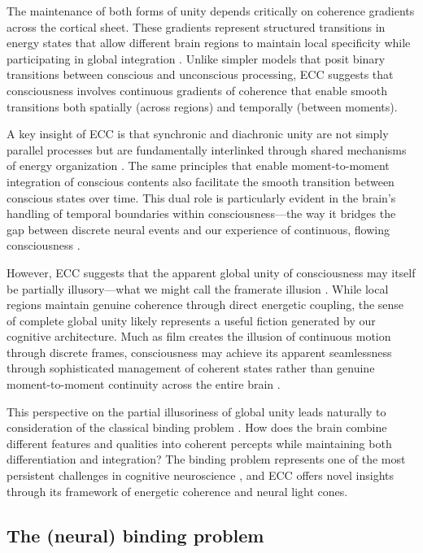 \begin{refsection}
The maintenance of both forms of unity depends critically on coherence gradients across the cortical sheet. These gradients represent structured transitions in energy states that allow different brain regions to maintain local specificity while participating in global integration \cite{adhikari2010cross}. Unlike simpler models that posit binary transitions between conscious and unconscious processing, ECC suggests that consciousness involves continuous gradients of coherence that enable smooth transitions both spatially (across regions) and temporally (between moments).

A key insight of ECC is that synchronic and diachronic unity are not simply parallel processes but are fundamentally interlinked through shared mechanisms of energy organization \cite{wang2010neurophysiological}. The same principles that enable moment-to-moment integration of conscious contents also facilitate the smooth transition between conscious states over time. This dual role is particularly evident in the brain's handling of temporal boundaries within consciousness—the way it bridges the gap between discrete neural events and our experience of continuous, flowing consciousness \cite{vanrullen2003perception}.

However, ECC suggests that the apparent global unity of consciousness may itself be partially illusory—what we might call the framerate illusion \cite{panzeri2010sensory, harris2019conscious}. While local regions maintain genuine coherence through direct energetic coupling, the sense of complete global unity likely represents a useful fiction generated by our cognitive architecture. Much as film creates the illusion of continuous motion through discrete frames, consciousness may achieve its apparent seamlessness through sophisticated management of coherent states rather than genuine moment-to-moment continuity across the entire brain \cite{crick1990towards}.

This perspective on the partial illusoriness of global unity leads naturally to consideration of the classical binding problem \cite{roskies1999binding}. How does the brain combine different features and qualities into coherent percepts while maintaining both differentiation and integration? The binding problem represents one of the most persistent challenges in cognitive neuroscience \cite{treisman1996binding}, and ECC offers novel insights through its framework of energetic coherence and neural light cones.

\subsection{The (neural) binding problem}


\end{refsection}
